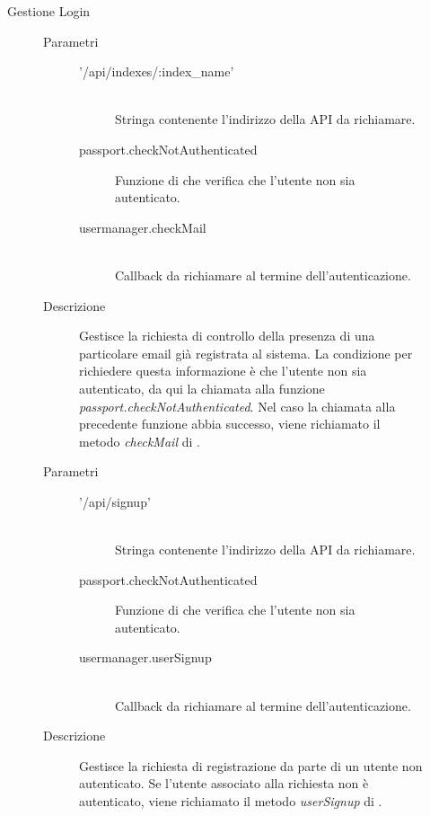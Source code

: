 \begin{description}
\begin{description}
\begin{mldescription}
 \end{mldescription} 
 
 \item[Gestione Login]
 \begin{mldescription}
 \begin{description}
    \item[Parametri] \hfill
     \begin{description}
      \item['/api/indexes/:index\_name'] \hfill \\
      Stringa contenente l'indirizzo della API da richiamare.
      \item[passport.checkNotAuthenticated]
      Funzione di  che verifica che l'utente non sia autenticato.
      \item[usermanager.checkMail] \hfill \\
      Callback da richiamare al termine dell'autenticazione.
     \end{description}
    \item[Descrizione]
    Gestisce la richiesta di controllo della presenza di una particolare email già registrata al sistema. La condizione per richiedere questa informazione è che l'utente non sia autenticato, da qui la chiamata alla funzione \textit{passport.checkNotAuthenticated}. Nel caso la chiamata alla precedente funzione abbia successo, viene richiamato il metodo \textit{checkMail} di .
 \end{description}
 
 \begin{description}
    \item[Parametri] \hfill
     \begin{description}
      \item['/api/signup'] \hfill \\
      Stringa contenente l'indirizzo della API da richiamare.
      \item[passport.checkNotAuthenticated]
      Funzione di  che verifica che l'utente non sia autenticato.
      \item[usermanager.userSignup] \hfill \\
      Callback da richiamare al termine dell'autenticazione.
     \end{description}
    \item[Descrizione]
    Gestisce la richiesta di registrazione da parte di un utente non autenticato. Se l'utente associato alla richiesta non è autenticato, viene richiamato il metodo \textit{userSignup} di .
 \end{description}
 

\end{mldescription}
\end{description}
\end{description}
